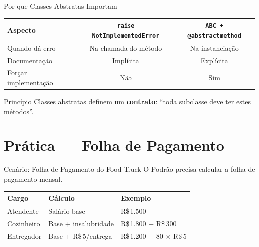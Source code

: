 \documentclass[aspectratio=169]{beamer}
\begin{document}
\begin{frame}{Por que Classes Abstratas Importam}
  \begin{center}
    \begin{tabular}{lcc}
      \toprule
      \textbf{Aspecto} & \texttt{raise NotImplementedError} & \texttt{ABC + @abstractmethod} \\
      \midrule
      Quando dá erro   & Na chamada do método & Na instanciação \\
      Documentação      & Implícita             & Explícita \\
      Forçar implementação & Não & Sim \\
      \bottomrule
    \end{tabular}
  \end{center}

  \begin{exampleblock}{Princípio}
    Classes abstratas definem um \textbf{contrato}: ``toda subclasse deve ter estes métodos''.
  \end{exampleblock}
\end{frame}

\section{Prática — Folha de Pagamento}

\begin{frame}{Cenário: Folha de Pagamento do Food Truck}
  O Podrão precisa calcular a folha de pagamento mensal.

  \bigskip

  \begin{center}
    \begin{tabular}{lll}
      \toprule
      \textbf{Cargo} & \textbf{Cálculo} & \textbf{Exemplo} \\
      \midrule
      Atendente   & Salário base              & R\$\,1.500 \\
      Cozinheiro  & Base + insalubridade      & R\$\,1.800 + R\$\,300 \\
      Entregador  & Base + R\$\,5/entrega     & R\$\,1.200 + 80 $\times$ R\$\,5 \\
      \bottomrule
    \end{tabular}
  \end{center}
\end{frame}
\end{document}
